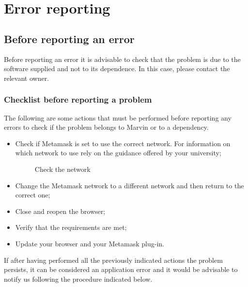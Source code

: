 \documentclass[ManualeUtente]{subfiles}
\begin{document}
\chapter{Error reporting}
\section{Before reporting an error}
Before reporting an error it is advisable to check that the problem is due to the software supplied and not to its dependence. In this case, please contact the relevant owner. \\

\subsection{Checklist before reporting a problem}
The following are some actions that must be performed before reporting any errors to check if the problem belongs to Marvin or to a dependency.

\begin{itemize}
	\item Check if Metamask is set to use the correct network. For information on which network to use rely on the guidance offered by your university;
	\begin{figure}[H]
		\centering
		\caption{Check the network}
		\label{fig:Check the network}
	\end{figure}
	\item Change the Metamask network to a different network and then return to the correct one;
	\item Close and reopen the browser;
	\item Verify that the requirements are met;
	\item Update your browser and your Metamask plug-in.
\end{itemize}
If after having performed all the previously indicated actions the problem persists, it can be considered an application error and it would be advisable to notify us following the procedure indicated below.
\end{document}
